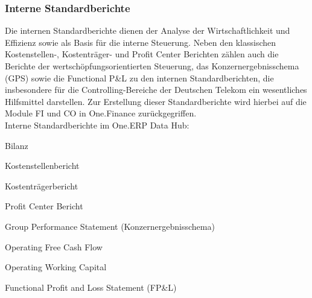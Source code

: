 \subsubsection{Interne Standardberichte}
Die internen Standardberichte dienen der Analyse der Wirtschaftlichkeit und Effizienz sowie als Basis für die interne Steuerung. Neben den klassischen Kostenstellen-, Kostenträger- und Profit Center Berichten zählen auch die Berichte der wertschöpfungsorientierten Steuerung, das Konzernergebnisschema (GPS) sowie die Functional P\&L zu den internen Standardberichten, die insbesondere für die Controlling-Bereiche der Deutschen Telekom ein wesentliches Hilfsmittel darstellen. Zur Erstellung dieser Standardberichte wird hierbei auf die Module FI und CO in One.Finance zurückgegriffen.\\
Interne Standardberichte im One.ERP Data Hub:
\begin{compactitem}  
\item 		Bilanz
\item     Kostenstellenbericht
\item     Kostenträgerbericht
\item     Profit Center Bericht
\item     Group Performance Statement (Konzernergebnisschema)
\item     Operating Free Cash Flow
\item     Operating Working Capital
\item    Functional Profit and Loss Statement (FP\&L)
\end{compactitem}